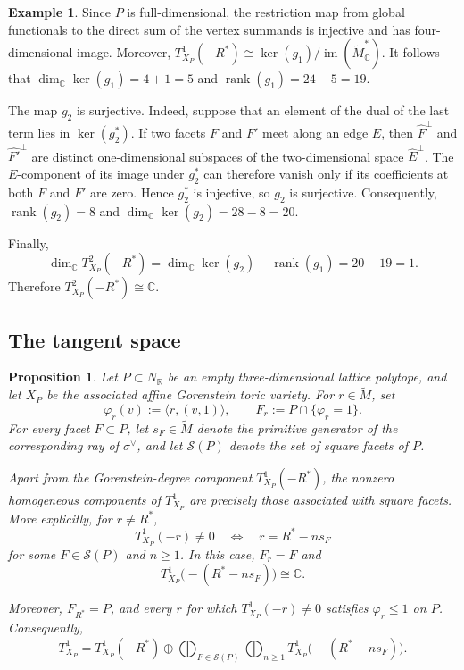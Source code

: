 \documentclass[11pt]{amsart}
\numberwithin{equation}{section}
\theoremstyle{plain}
\newtheorem{proposition}[theorem]{Proposition}
\theoremstyle{definition}
\newtheorem{example}[theorem]{Example}
\newcommand{\0}{$0$-mutable}
\newcommand{\RR}{\ensuremath{\mathbb{R}}}
\newcommand{\CC}{\ensuremath{\mathbb{C}}}
\renewcommand{\1}{$1$-rigid}
\renewcommand{\0}{$0$-mutable}
\begin{document}
\begin{example}
Since \(P\) is full-dimensional, the restriction map from global
functionals to the direct sum of the vertex summands is injective and
has four-dimensional image. Moreover,
\(T^1_{X_P}(-R^*)\cong
\ker(g_1)/\operatorname{im}(\widetilde M_{\CC}^*)\).
It follows that \(\dim_{\CC}\ker(g_1)=4+1=5\) and
\(\operatorname{rank}(g_1)=24-5=19\).

The map \(g_2\) is surjective. Indeed, suppose that an element of the
dual of the last term lies in \(\ker(g_2^*)\). If two facets \(F\) and
\(F'\) meet along an edge \(E\), then \(\widehat F^\perp\) and
\(\widehat{F'}^\perp\) are distinct one-dimensional subspaces of the
two-dimensional space \(\widehat E^\perp\). The \(E\)-component of its
image under \(g_2^*\) can therefore vanish only if its coefficients at
both \(F\) and \(F'\) are zero. Hence \(g_2^*\) is injective, so \(g_2\)
is surjective. Consequently, \(\operatorname{rank}(g_2)=8\) and
\(\dim_{\CC}\ker(g_2)=28-8=20\).

Finally,
$$\dim_{\CC}T^2_{X_P}(-R^*)=
\dim_{\CC}\ker(g_2)-\operatorname{rank}(g_1)=20-19=1.$$
Therefore \(T^2_{X_P}(-R^*)\cong\CC\).
\end{example}













\subsection{The tangent space}

{
\begin{proposition}
\label{prop empty T1 degrees}
Let \(P\subset N_{\RR}\) be an empty three-dimensional lattice
polytope, and let \(X_P\) be the associated affine Gorenstein toric
variety. For \(r\in\widetilde M\), set
\[
\varphi_r(v):=\langle r,(v,1)\rangle,
\qquad
F_r:=P\cap\{\varphi_r=1\}.
\]
For every facet \(F\subset P\), let \(s_F\in\widetilde M\) denote the
primitive generator of the corresponding ray of \(\sigma^\vee\), and
let \(\mathcal S(P)\) denote the set of square facets of \(P\).

Apart from the Gorenstein-degree component \(T^1_{X_P}(-R^*)\), the
nonzero homogeneous components of \(T^1_{X_P}\) are precisely those
associated with square facets. More explicitly, for \(r\neq R^*\),
\[
T^1_{X_P}(-r)\neq0
\quad\Longleftrightarrow\quad
r=R^*-ns_F
\]
for some \(F\in\mathcal S(P)\) and \(n\geq1\). In this case,
\(F_r=F\) and
\[
T^1_{X_P}\bigl(-(R^*-ns_F)\bigr)\cong\CC.
\]

Moreover, \(F_{R^*}=P\), and every \(r\) for which
\(T^1_{X_P}(-r)\neq0\) satisfies \(\varphi_r\leq1\) on \(P\).
Consequently,
\[
T^1_{X_P}
=
T^1_{X_P}(-R^*)
\oplus
\bigoplus_{F\in\mathcal S(P)}
\bigoplus_{n\geq1}
T^1_{X_P}\bigl(-(R^*-ns_F)\bigr).
\]
\end{proposition}
}
\end{document}
